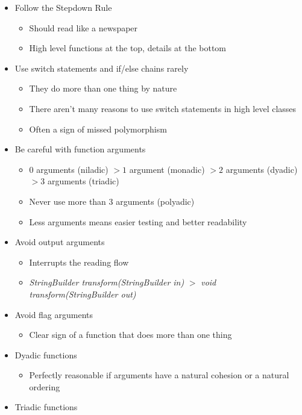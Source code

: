 \begin{itemize}
    \item Follow the Stepdown Rule
    \begin{itemize}
        \item Should read like a newspaper
        \item High level functions at the top, details at the bottom
    \end{itemize}
    \item Use switch statements and if/else chains rarely
    \begin{itemize}
        \item They do more than one thing by nature
        \item There aren't many reasons to use switch statements in high level classes
        \item Often a sign of missed polymorphism
    \end{itemize}
    \newpage
    \item Be careful with function arguments
    \begin{itemize}
        \item $0$ arguments (niladic) $>1$ argument (monadic) $>2$ arguments (dyadic) $>3$ arguments (triadic)
        \item Never use more than $3$ arguments (polyadic)
        \item Less arguments means easier testing and better readability
    \end{itemize}
    \item Avoid output arguments
    \begin{itemize}
        \item Interrupts the reading flow
        \item \textit{StringBuilder transform(StringBuilder in)} $>$ \textit{void transform(StringBuilder out)}
    \end{itemize}
    \item Avoid flag arguments
    \begin{itemize}
        \item Clear sign of a function that does more than one thing
    \end{itemize}
    \item Dyadic functions
    \begin{itemize}
        \item Perfectly reasonable if arguments have a natural cohesion or a natural ordering
    \end{itemize}
    \item Triadic functions
    \begin{itemize}

\end{itemize}
\end{itemize}
